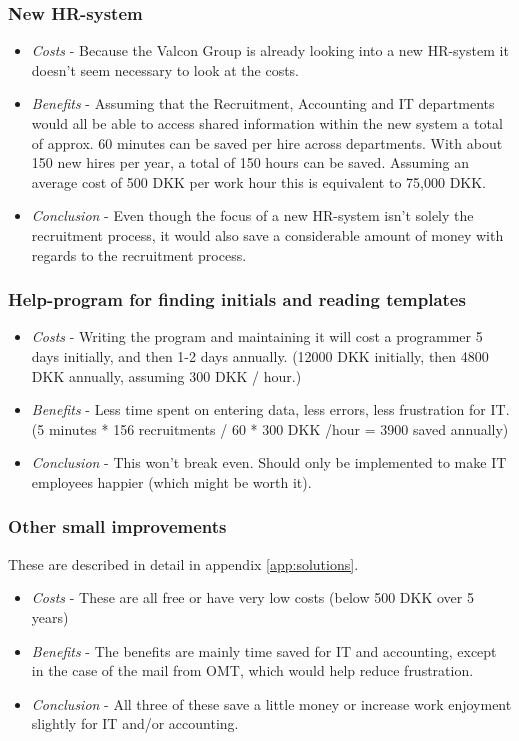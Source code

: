 \subsubsection{New HR-system}
\begin{itemize}
	\item \emph{Costs} - Because the Valcon Group is already looking into a new HR-system it doesn't seem necessary to look at the costs.
	\item \emph{Benefits} - Assuming that the Recruitment, Accounting and IT departments would all be able to access shared information within the new system a total of approx. 60 minutes can be saved per hire across departments. With about 150 new hires per year, a total of 150 hours can be saved. Assuming an average cost of 500 DKK per work hour this is equivalent to 75,000 DKK.
	\item \emph{Conclusion} - Even though the focus of a new HR-system isn't solely the recruitment process, it would also save a considerable amount of money with regards to the recruitment process.
\end{itemize}

\subsubsection{Help-program for finding initials and reading templates}
\begin{itemize}
	\item \emph{Costs} - Writing the program and maintaining it will cost a programmer 5 days initially, and then 1-2 days annually. (12000 DKK initially, then 4800 DKK annually, assuming 300 DKK / hour.)
	\item \emph{Benefits} - Less time spent on entering data, less errors, less frustration for IT. (5 minutes * 156 recruitments / 60 * 300 DKK /hour = 3900 saved annually)
	\item \emph{Conclusion} - This won't break even. Should only be implemented to make IT employees happier (which might be worth it).
\end{itemize}

\subsubsection{Other small improvements}
These are described in detail in appendix \ref{app:solutions}.
\begin{itemize}
	\item \emph{Costs} - These are all free or have very low costs (below 500 DKK over 5 years)
	\item \emph{Benefits} - The benefits are mainly time saved for IT and accounting, except in the case of the mail from OMT, which would help reduce frustration.
	\item \emph{Conclusion} - All three of these save a little money or increase work enjoyment slightly for IT and/or accounting.
\end{itemize}